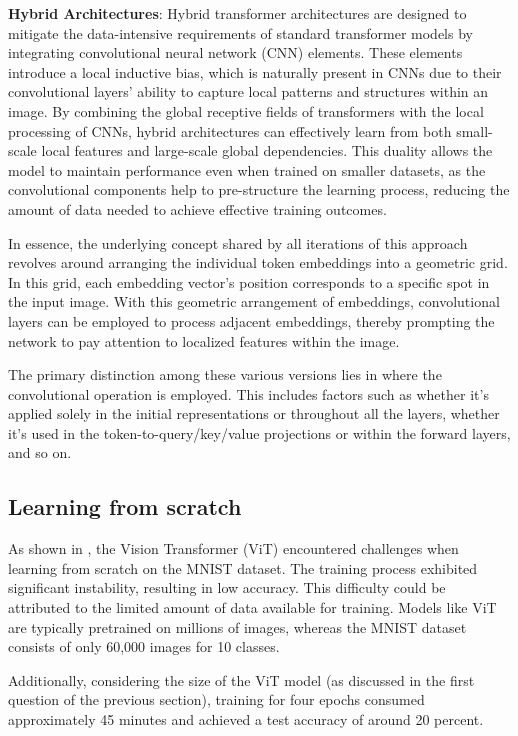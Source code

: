 \textbf{Hybrid Architectures}: Hybrid transformer architectures are designed to mitigate the data-intensive requirements of standard transformer models by integrating convolutional neural network (CNN) elements. These elements introduce a local inductive bias, which is naturally present in CNNs due to their convolutional layers' ability to capture local patterns and structures within an image. By combining the global receptive fields of transformers with the local processing of CNNs, hybrid architectures can effectively learn from both small-scale local features and large-scale global dependencies. This duality allows the model to maintain performance even when trained on smaller datasets, as the convolutional components help to pre-structure the learning process, reducing the amount of data needed to achieve effective training outcomes.

In essence, the underlying concept shared by all iterations of this approach revolves around arranging the individual token embeddings into a geometric grid. In this grid, each embedding vector's position corresponds to a specific spot in the input image. With this geometric arrangement of embeddings, convolutional layers can be employed to process adjacent embeddings, thereby prompting the network to pay attention to localized features within the image.

The primary distinction among these various versions lies in where the convolutional operation is employed. This includes factors such as whether it's applied solely in the initial representations or throughout all the layers, whether it's used in the token-to-query/key/value projections or within the forward layers, and so on.

\subsection{Learning from scratch}
As shown in , the Vision Transformer (ViT) encountered challenges when learning from scratch on the MNIST dataset. The training process exhibited significant instability, resulting in low accuracy. This difficulty could be attributed to the limited amount of data available for training. Models like ViT are typically pretrained on millions of images, whereas the MNIST dataset consists of only 60,000 images for 10 classes.

Additionally, considering the size of the ViT model (as discussed in the first question of the previous section), training for four epochs consumed approximately 45 minutes and achieved a test accuracy of around 20 percent.

